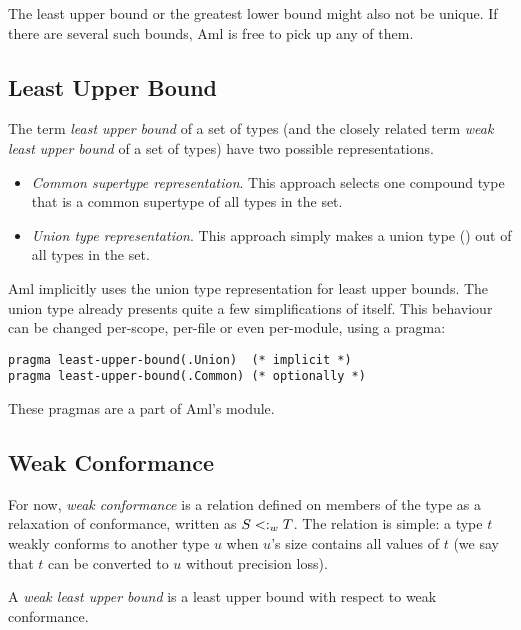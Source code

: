 The least upper bound or the greatest lower bound might also not be unique. If there are several such bounds, Aml is free to pick up any of them. 




\subsection{Least Upper Bound}
\label{sec:least-upper-bound}

The term {\em least upper bound} of a set of types (and the closely related term {\em weak least upper bound} of a set of types) have two possible representations. 

\begin{itemize}
  \item {\em Common supertype representation}. This approach selects one compound type that is a common supertype of all types in the set. 
  \item {\em Union type representation}. This approach simply makes a union type () out of all types in the set. 
\end{itemize}

Aml implicitly uses the union type representation for least upper bounds. The union type already presents quite a few simplifications of itself. This behaviour can be changed per-scope, per-file or even per-module, using a pragma:
\begin{lstlisting}
pragma least-upper-bound(.Union)  (* implicit *)
pragma least-upper-bound(.Common) (* optionally *)
\end{lstlisting}
These pragmas are a part of Aml's  module. %





\subsection{Weak Conformance}
\label{sec:weak-conformance}

For now, {\em weak conformance} is a relation defined on members of the  type as a relaxation of conformance, written as $S <: _w T$. The relation is simple: a type $t$ weakly conforms to another type $u$ when $u$'s size contains all values of $t$ (we say that $t$ can be converted to $u$ without precision loss). 

A {\em weak least upper bound} is a least upper bound with respect to weak conformance. 





